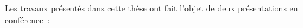 





Les travaux présentés dans cette thèse ont fait l'objet de deux présentations en conférence~:







